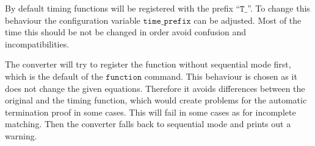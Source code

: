By default timing functions will be registered with the prefix ``$\texttt{T\_}$''.
To change this behaviour the configuration variable $\texttt{time\_prefix}$ can be adjusted.
Most of the time this should be not be changed in order avoid confusion and incompatibilities.

The converter will try to register the function without sequential mode first, which is the default of the $\texttt{function}$ command.
This behaviour is chosen as it does not change the given equations.
Therefore it avoids differences between the original and the timing function,
which would create problems for the automatic termination proof in some cases.
This will fail in some cases as for incomplete matching.
Then the converter falls back to sequential mode and prints out a warning.
